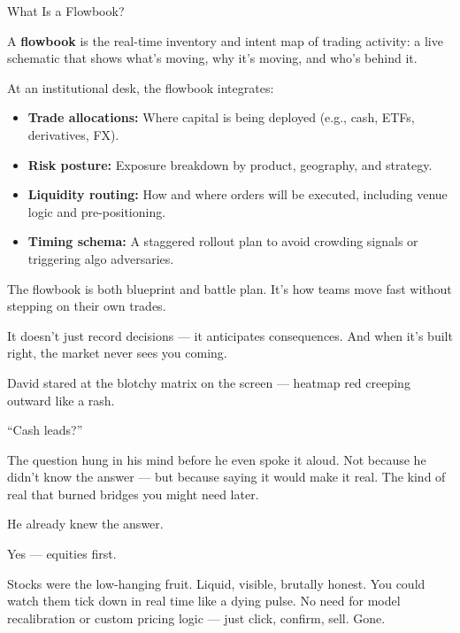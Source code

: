 \begin{TechnicalSidebar}{What Is a Flowbook?}

    A \textbf{flowbook} is the real-time inventory and intent map of trading activity:  
    a live schematic that shows what’s moving, why it’s moving, and who’s behind it.
  
    \medskip
  
    At an institutional desk, the flowbook integrates:

    \medskip
  
    \begin{itemize}
      \item \textbf{Trade allocations:} Where capital is being deployed (e.g., cash, ETFs, 
      derivatives, FX).
      \item \textbf{Risk posture:} Exposure breakdown by product, geography, and strategy.
      \item \textbf{Liquidity routing:} How and where orders will be executed, including venue 
      logic and pre-positioning.
      \item \textbf{Timing schema:} A staggered rollout plan to avoid crowding signals or 
      triggering algo adversaries.
    \end{itemize}
  
    \medskip
  
    The flowbook is both blueprint and battle plan.  
    It’s how teams move fast without stepping on their own trades.
  
    \medskip
  
    It doesn’t just record decisions — it anticipates consequences.
    And when it’s built right, the market never sees you coming.
  
\end{TechnicalSidebar}

\medskip


David stared at the blotchy matrix on the screen — heatmap red creeping outward like a rash.

“Cash leads?”

The question hung in his mind before he even spoke it aloud. Not because he didn’t know the answer — but because saying it would make it real. The kind of real that burned bridges you might need later.

He already knew the answer.

Yes — equities first.

Stocks were the low-hanging fruit. Liquid, visible, brutally honest. You could watch them tick down in real time like a dying pulse. No need for model recalibration or custom pricing logic — just click, confirm, sell. Gone.

